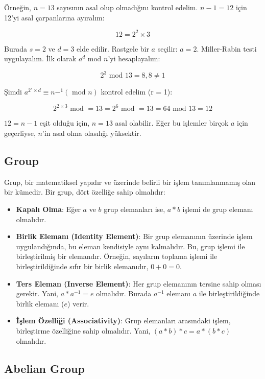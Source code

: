 Örneğin, $n = 13$ sayısının asal olup olmadığını kontrol edelim. $n - 1 = 12$ için 12'yi asal çarpanlarına ayıralım:

\[ 12 = 2^2 \times 3 \]

Burada $s = 2$ ve $d = 3$ elde edilir. Rastgele bir $a$ seçilir: $a = 2$. Miller-Rabin testi uygulayalım. İlk olarak $a^d \text{ mod } n$'yi hesaplayalım:

\[ 2^3 \text{ mod } 13 = 8, 8 \neq 1 \]

Şimdi $a^{2^r \times d} \equiv n -^1 (\text{ mod } n)$ kontrol edelim (r = 1):

\[ 2^{2 \times 3} \text{ mod } = 13 = 2^6 \text{ mod } = 13 = 64 \text{ mod } 13 = 12 \]

$12 = n - 1$ eşit olduğu için, $n = 13$ asal olabilir. Eğer bu işlemler birçok $a$ için geçerliyse, $n$'in asal olma olasılığı yüksektir.

\newpage

\subsection{Group}

Grup, bir matematiksel yapıdır ve üzerinde belirli bir işlem tanımlanmamış olan bir kümedir. Bir grup, dört özelliğe sahip olmalıdır:

\begin{itemize}
    \item \textbf{Kapalı Olma}: Eğer $a$ ve $b$ grup elemanları ise, $a * b$ işlemi de grup elemanı olmalıdır.
    \item \textbf{Birlik Elemanı (Identity Element)}: Bir grup elemanının üzerinde işlem uygulandığında, bu eleman kendisiyle aynı kalmalıdır. Bu, grup işlemi ile birleştirilmiş bir elemandır. Örneğin, sayıların toplama işlemi ile birleştirildiğinde sıfır bir birlik elemanıdır, $0 + 0 = 0$.
    \item \textbf{Ters Eleman (Inverse Element)}: Her grup elemanının tersine sahip olması gerekir. Yani, $a * a^{-1} = e$ olmalıdır. Burada $a^{-1}$ elemanı $a$ ile birleştirildiğinde birlik elemanı ($e$) verir.
    \item \textbf{İşlem Özelliği (Associativity)}: Grup elemanları arasındaki işlem, birleştirme özelliğine sahip olmalıdır. Yani, $(a * b) * c = a * (b * c)$ olmalıdır.
\end{itemize}

\newpage

\subsection{Abelian Group}

